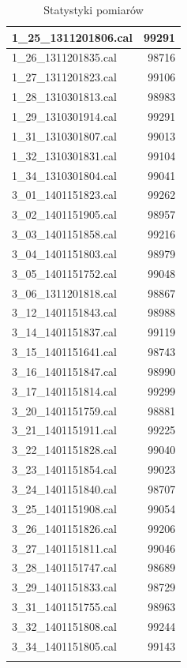 {\begin{longtable}{|l|r|}
    1\_25\_1311201806.cal & 99291 \\ \hline
    1\_26\_1311201835.cal & 98716 \\ \hline
    1\_27\_1311201823.cal & 99106 \\ \hline
    1\_28\_1310301813.cal & 98983 \\ \hline
    1\_29\_1310301914.cal & 99291 \\ \hline
    1\_31\_1310301807.cal & 99013 \\ \hline
    1\_32\_1310301831.cal & 99104 \\ \hline
    1\_34\_1310301804.cal & 99041 \\ \hline
    3\_01\_1401151823.cal & 99262 \\ \hline
    3\_02\_1401151905.cal & 98957 \\ \hline
    3\_03\_1401151858.cal & 99216 \\ \hline
    3\_04\_1401151803.cal & 98979 \\ \hline
    3\_05\_1401151752.cal & 99048 \\ \hline
    3\_06\_1311201818.cal & 98867 \\ \hline
    3\_12\_1401151843.cal & 98988 \\ \hline
    3\_14\_1401151837.cal & 99119 \\ \hline
    3\_15\_1401151641.cal & 98743 \\ \hline
    3\_16\_1401151847.cal & 98990 \\ \hline
    3\_17\_1401151814.cal & 99299 \\ \hline
    3\_20\_1401151759.cal & 98881 \\ \hline
    3\_21\_1401151911.cal & 99225 \\ \hline
    3\_22\_1401151828.cal & 99040 \\ \hline
    3\_23\_1401151854.cal & 99023 \\ \hline
    3\_24\_1401151840.cal & 98707 \\ \hline
    3\_25\_1401151908.cal & 99054 \\ \hline
    3\_26\_1401151826.cal & 99206 \\ \hline
    3\_27\_1401151811.cal & 99046 \\ \hline
    3\_28\_1401151747.cal & 98689 \\ \hline
    3\_29\_1401151833.cal & 98729 \\ \hline
    3\_31\_1401151755.cal & 98963 \\ \hline
    3\_32\_1401151808.cal & 99244 \\ \hline
    3\_34\_1401151805.cal & 99143 \\ \hline
    \caption{Statystyki pomiarów}
    \label{tab:measurementstats}\\
\end{longtable}
}
